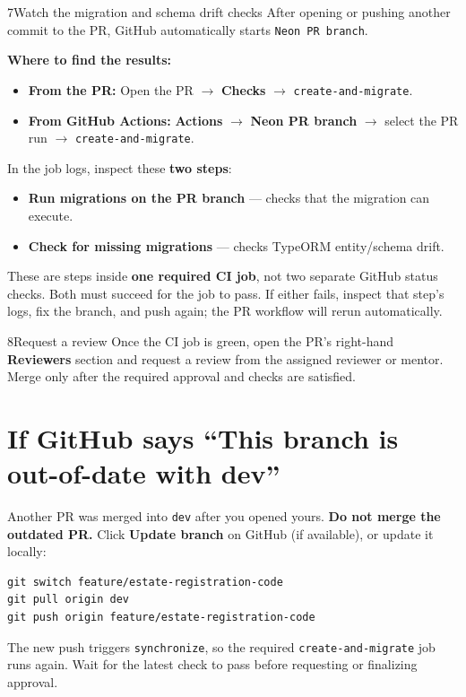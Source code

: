 \documentclass[10pt,a4paper]{article}
\begin{document}
\begin{stepbox}{7}{Watch the migration and schema drift checks}
After opening or pushing another commit to the PR, GitHub automatically starts \texttt{Neon PR branch}.

\textbf{Where to find the results:}
\begin{itemize}
  \item \textbf{From the PR:} Open the PR \(\rightarrow\) \textbf{Checks} \(\rightarrow\) \texttt{create-and-migrate}.
  \item \textbf{From GitHub Actions:} \textbf{Actions} \(\rightarrow\) \textbf{Neon PR branch} \(\rightarrow\) select the PR run \(\rightarrow\) \texttt{create-and-migrate}.
\end{itemize}

In the job logs, inspect these \textbf{two steps}:
\begin{itemize}
  \item \textbf{Run migrations on the PR branch} --- checks that the migration can execute.
  \item \textbf{Check for missing migrations} --- checks TypeORM entity/schema drift.
\end{itemize}
These are steps inside \textbf{one required CI job}, not two separate GitHub status checks. Both must succeed for the job to pass. If either fails, inspect that step's logs, fix the branch, and push again; the PR workflow will rerun automatically.
\end{stepbox}

\begin{stepbox}{8}{Request a review}
Once the CI job is green, open the PR's right-hand \textbf{Reviewers} section and request a review from the assigned reviewer or mentor. Merge only after the required approval and checks are satisfied.
\end{stepbox}

\section*{If GitHub says ``This branch is out-of-date with dev''}
Another PR was merged into \texttt{dev} after you opened yours. \textbf{Do not merge the outdated PR.} Click \textbf{Update branch} on GitHub (if available), or update it locally:
\begin{lstlisting}[style=command]
git switch feature/estate-registration-code
git pull origin dev
git push origin feature/estate-registration-code
\end{lstlisting}
The new push triggers \texttt{synchronize}, so the required \texttt{create-and-migrate} job runs again. Wait for the latest check to pass before requesting or finalizing approval.
\end{document}
